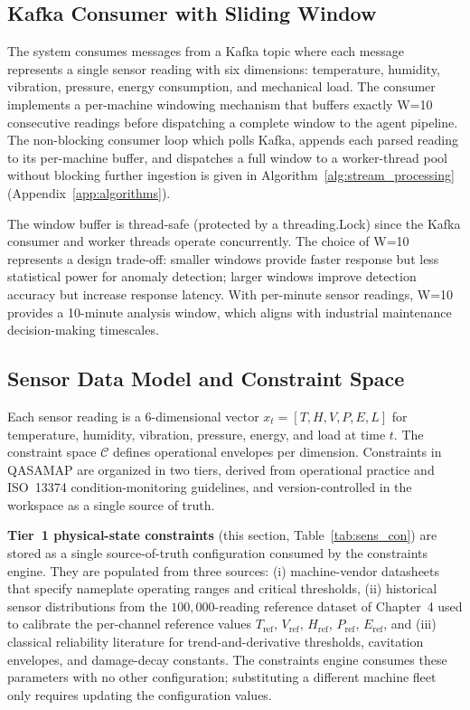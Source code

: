\subsection{Kafka Consumer with Sliding Window}
The system consumes messages from a Kafka topic where each message represents a single sensor reading with six dimensions: temperature, humidity, vibration, pressure, energy consumption, and mechanical load. The consumer implements a per-machine windowing mechanism that buffers exactly W=10 consecutive readings before dispatching a complete window to the agent pipeline. The non-blocking consumer loop  which polls Kafka, appends each parsed reading to its per-machine buffer, and dispatches a full window to a worker-thread pool without blocking further ingestion  is given in Algorithm~\ref{alg:stream_processing} (Appendix~\ref{app:algorithms}).

The window buffer is thread-safe (protected by a threading.Lock) since the Kafka consumer and worker threads operate concurrently. The choice of W=10 represents a design trade-off: smaller windows provide faster response but less statistical power for anomaly detection; larger windows improve detection accuracy but increase response latency. With per-minute sensor readings, W=10 provides a 10-minute analysis window, which aligns with industrial maintenance decision-making timescales. 

\subsection{Sensor Data Model and Constraint Space}
Each sensor reading is a 6-dimensional vector $x_t = [T, H, V, P, E, L]$ for temperature, humidity, vibration, pressure, energy, and load at time $t$. The constraint space $\mathcal{C}$ defines operational envelopes per dimension. Constraints in QASAMAP are organized in two tiers, derived from operational practice and ISO~13374 condition-monitoring guidelines, and version-controlled in the workspace as a single source of truth.



\textbf{Tier~1 physical-state constraints} (this section, Table~\ref{tab:sens_con}) are stored as a single source-of-truth configuration consumed by the constraints engine. They are populated from three sources: (i) machine-vendor datasheets that specify nameplate operating ranges and critical thresholds, (ii) historical sensor distributions from the $100{,}000$-reading reference dataset of Chapter~4 used to calibrate the per-channel reference values $T_{\text{ref}}$, $V_{\text{ref}}$, $H_{\text{ref}}$, $P_{\text{ref}}$, $E_{\text{ref}}$, and (iii) classical reliability literature \cite{mobley_introduction_2002,jardine_review_2006} for trend-and-derivative thresholds, cavitation envelopes, and damage-decay constants. The constraints engine consumes these parameters with no other configuration; substituting a different machine fleet only requires updating the configuration values.

